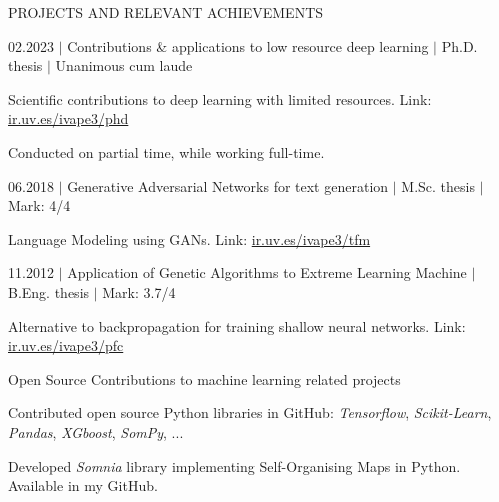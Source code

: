 \documentclass{resume} %
\begin{document}
\begin{rSection}{PROJECTS AND RELEVANT ACHIEVEMENTS}


\begin{rSubsection}{02.2023 $|$ Contributions \& applications to low resource deep learning    $|$  \textnormal{Ph.D. thesis  $|$  Unanimous cum laude}}{}{}{}  
	\vspace{-3pt}
	\item Scientific contributions to deep learning with limited resources. Link: 
	\href{https://roderic.uv.es/handle/10550/85791}{ir.uv.es/ivape3/phd}
	\item Conducted on partial time, while working full-time.
	
\end{rSubsection}
\vspace{-6pt}
\begin{rSubsection}{06.2018 $|$ Generative Adversarial Networks for text generation  $|$  \textnormal{M.Sc. thesis  $|$  Mark: 4/4}}{}{}{}  %

\vspace{-3pt}

\item Language Modeling using GANs. Link: \href{https://www.uv.es/ivape3/memoria_tfm.pdf}{ir.uv.es/ivape3/tfm}

\end{rSubsection}

\vspace{-6pt}

\begin{rSubsection}{11.2012 $|$ Application of Genetic Algorithms to Extreme Learning Machine  $|$  \textnormal{B.Eng. thesis  $|$  Mark: 3.7/4}}
{}{}{}

\vspace{-3pt}

\item Alternative  to backpropagation for training shallow neural networks. Link: \href{https://www.uv.es/ivape3/memoria_pfc.pdf}{ir.uv.es/ivape3/pfc}

\end{rSubsection}

\vspace{-6pt}

\begin{rSubsection}{Open Source Contributions to machine learning related projects}
	{}{}{}

	\vspace{-3pt}

	\item Contributed open source Python libraries in GitHub: \textit{Tensorflow}, \textit{Scikit-Learn}, \textit{Pandas}, \textit{XGboost}, \textit{SomPy}, ...
	\item Developed  \textit{Somnia} library implementing Self-Organising Maps in Python. Available in my GitHub.
\end{rSubsection}


\end{rSection}
\end{document}
